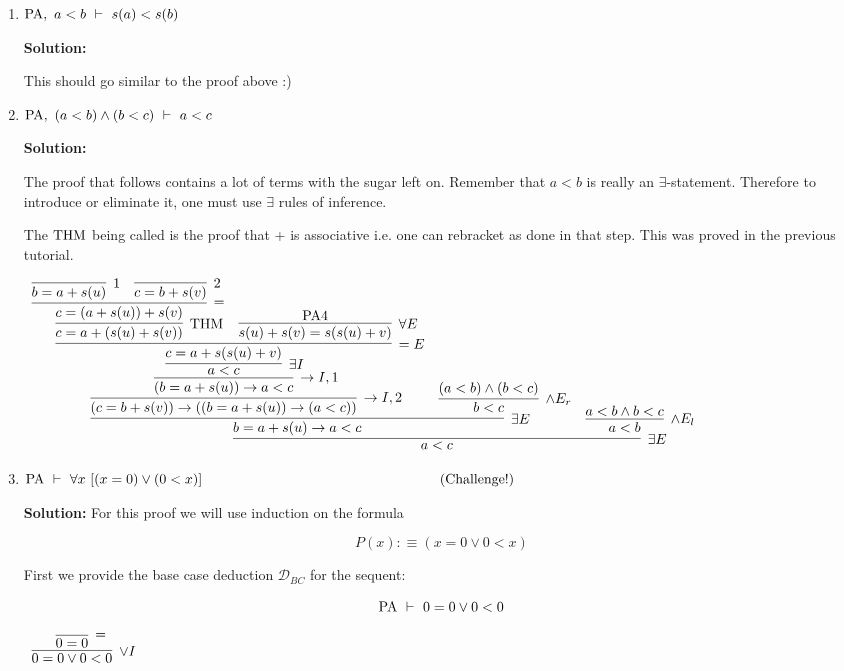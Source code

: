 \documentclass[11pt]{report}
\begin{document}
\begin{enumerate}
\begin{enumerate}
			\item $\text{PA} , \ a < b \ \vdash \ s(a) < s(b)$

			{\bf Solution:} 

			This should go similar to the proof above :) 

			\newpage
			\item $\PA , \ (a < b) \land (b < c) \ \vdash \ a < c$

			{\bf Solution:} 

			The proof that follows contains a lot of terms with the sugar left on. Remember that $a<b$ is really an $\exists$-statement. Therefore to introduce or eliminate it, one must use $\exists$ rules of inference.

			The $\text{THM}$ being called is the proof that + is associative i.e. one can rebracket as done in that step. This was proved in the previous tutorial.

				\begin{center}
					\footnotesize{$\begin{array}{c}
						\infer[\exists E]{a<c}
							{\infer[\exists E]{b = a + s(u) \to a<c}
								{\infer[\to I,2]{(c=b+s(v)) \to ((b=a+s(u)) \to (a<c))}
									{\infer[\to I,1]{(b=a+s(u)) \to a<c}
										{\infer[\exists I]{a<c}
											{\infer[=E]{c = a + s(s(u)+v)}
												{\infer[\THM]{c = a + (s(u)+s(v))}
													{\infer[=]{c = (a+s(u))+s(v)}
														{\infer[1]{b=a+s(u)}{}
														&
														\infer[2]{c=b+s(v)}{}}}
												&
												\infer[\forall E]{s(u)+s(v)=s(s(u)+v)}
													{\PA 4}}}}}
								&
								\infer[\land E_{r}]{b<c}{(a<b)\land (b<c)}}
							&
							\infer[\land E_{l}]{a<b}
								{a<b \land b<c}}					
					\end{array}$}
				\end{center}

			\newpage
			\item $\PA \ \vdash \ \forall x \ [(x = 0) \lor (0 < x)] \hspace{6cm} \text{(Challenge!)}$

			{\bf Solution:} For this proof we will use induction on the formula 

			$$P(x) :\equiv (x=0 \lor 0<x)$$

			First we provide the base case deduction $\mathcal{D}_{BC}$ for the sequent:

			$$\text{PA} \ \vdash \ 0=0 \lor 0<0$$

			\begin{center}
				$\begin{array}{c}
					\infer[\lor I]{0=0 \lor 0<0}
						{\infer[=]{0=0}
							{}}
				\end{array}$
			\end{center}
			

\end{enumerate}
\end{enumerate}
\end{document}
